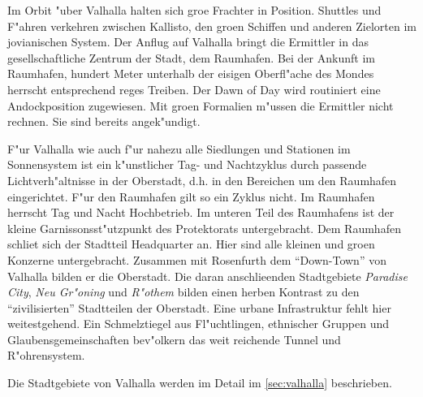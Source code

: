 

Im Orbit "uber Valhalla halten sich gro\3e Frachter in Position. Shuttles und F"ahren verkehren zwischen Kallisto, den gro\3en Schiffen und anderen Zielorten im jovianischen System. Der Anflug auf Valhalla bringt die Ermittler in das gesellschaftliche Zentrum der Stadt, dem Raumhafen. Bei der Ankunft im Raumhafen, hundert Meter unterhalb der eisigen Oberfl"ache des Mondes herrscht entsprechend reges Treiben. Der Dawn of Day wird routiniert eine Andockposition zugewiesen. Mit gro\3en Formalien m"ussen die Ermittler nicht rechnen. Sie sind bereits angek"undigt. 

F"ur Valhalla wie auch f"ur nahezu alle Siedlungen und Stationen im Sonnensystem ist ein k"unstlicher Tag- und Nachtzyklus durch passende Lichtverh"altnisse in der Oberstadt, d.h. in den Bereichen um den Raumhafen eingerichtet. F"ur den Raumhafen gilt so ein Zyklus nicht. Im Raumhafen herrscht Tag und Nacht Hochbetrieb. Im unteren Teil des Raumhafens ist der kleine Garnissonsst"utzpunkt des Protektorats untergebracht. Dem Raumhafen schlie\3t sich der Stadtteil Headquarter an. Hier sind alle kleinen und gro\3en Konzerne untergebracht. Zusammen mit Rosenfurth dem "`Down-Town"' von Valhalla bilden er die Oberstadt. Die daran anschlie\3enden Stadtgebiete \emph{Paradise City}, \emph{Neu Gr"oning} und \emph{R"othem} bilden einen herben Kontrast zu den "`zivilisierten"' Stadtteilen der Oberstadt. Eine urbane Infrastruktur fehlt hier weitestgehend. Ein Schmelztiegel aus Fl"uchtlingen, ethnischer Gruppen und Glaubensgemeinschaften bev"olkern das weit reichende Tunnel und R"ohrensystem.

\begin{remarks}
    Die Stadtgebiete von Valhalla werden im Detail im \cref{sec:valhalla} beschrieben.
\end{remarks}